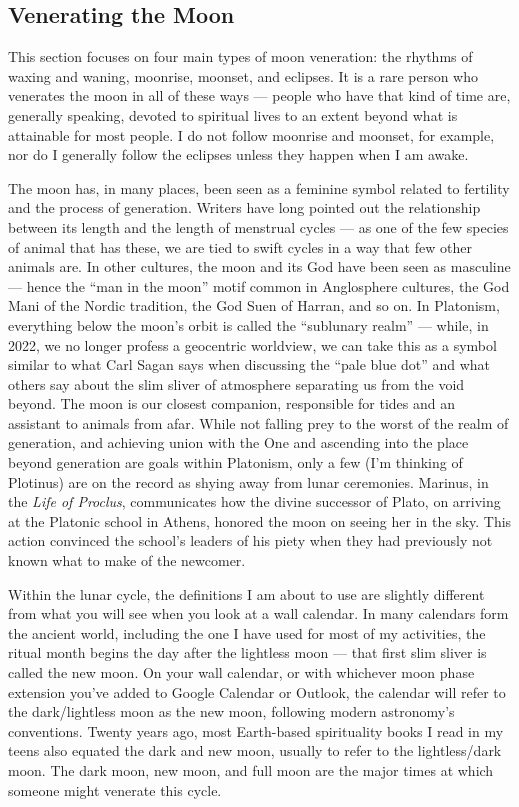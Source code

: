 \documentclass[
]{book}
\begin{document}
\hypertarget{venerating-the-moon}{%
\subsection{Venerating the Moon}\label{venerating-the-moon}}

This section focuses on four main types of moon veneration: the rhythms of waxing and waning, moonrise, moonset, and eclipses. It is a rare person who venerates the moon in all of these ways --- people who have that kind of time are, generally speaking, devoted to spiritual lives to an extent beyond what is attainable for most people. I do not follow moonrise and moonset, for example, nor do I generally follow the eclipses unless they happen when I am awake.

The moon has, in many places, been seen as a feminine symbol related to fertility and the process of generation. Writers have long pointed out the relationship between its length and the length of menstrual cycles --- as one of the few species of animal that has these, we are tied to swift cycles in a way that few other animals are. In other cultures, the moon and its God have been seen as masculine --- hence the ``man in the moon'' motif common in Anglosphere cultures, the God Mani of the Nordic tradition, the God Suen of Harran, and so on. In Platonism, everything below the moon's orbit is called the ``sublunary realm'' --- while, in 2022, we no longer profess a geocentric worldview, we can take this as a symbol similar to what Carl Sagan says when discussing the ``pale blue dot'' and what others say about the slim sliver of atmosphere separating us from the void beyond. The moon is our closest companion, responsible for tides and an assistant to animals from afar. While not falling prey to the worst of the realm of generation, and achieving union with the One and ascending into the place beyond generation are goals within Platonism, only a few (I'm thinking of Plotinus) are on the record as shying away from lunar ceremonies. Marinus, in the \emph{Life of Proclus}, communicates how the divine successor of Plato, on arriving at the Platonic school in Athens, honored the moon on seeing her in the sky. This action convinced the school's leaders of his piety when they had previously not known what to make of the newcomer.

Within the lunar cycle, the definitions I am about to use are slightly different from what you will see when you look at a wall calendar. In many calendars form the ancient world, including the one I have used for most of my activities, the ritual month begins the day after the lightless moon --- that first slim sliver is called the new moon. On your wall calendar, or with whichever moon phase extension you've added to Google Calendar or Outlook, the calendar will refer to the dark/lightless moon as the new moon, following modern astronomy's conventions. Twenty years ago, most Earth-based spirituality books I read in my teens also equated the dark and new moon, usually to refer to the lightless/dark moon. The dark moon, new moon, and full moon are the major times at which someone might venerate this cycle.
\end{document}

